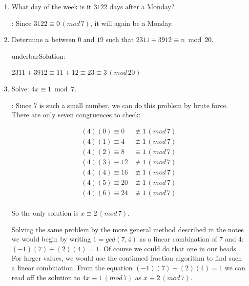 \documentclass[11pt]{amsart}
\begin{document}
\begin{enumerate}


\item What day of the week is it $3122$ days after a Monday?

\medskip

:  Since $3122 \equiv 0 \,(mod\,7)$, it will again be a Monday.

\medskip


\item Determine $n$ between  $0$ and $19$ such that 
$2311+3912 \equiv n \bmod{20}$.

\medskip

underbar{Solution}: 

$2311 + 3912 \equiv 11+12 \equiv 23 \equiv 3 \,(mod\,20)$
 
\medskip
 

 
\item Solve:  $4x\equiv 1\bmod 7$.

\medskip

: Since $7$ is such a small number, we can do this problem by
brute force. There are only seven congruences to check:

\begin{align*}
(4)(0) \equiv 0 &\not\equiv 1\,(mod\, 7)\\[4pt]
(4)(1) \equiv 4 &\not\equiv 1\,(mod\, 7)\\[4pt]
(4)(2) \equiv 8 &\equiv 1\,(mod\, 7)\\[4pt]
(4)(3) \equiv 12 &\not\equiv 1\,(mod\, 7)\\[4pt]
(4)(4) \equiv 16 &\not\equiv 1\,(mod\, 7)\\[4pt]
(4)(5) \equiv 20 &\not\equiv 1\,(mod\, 7)\\[4pt]
(4)(6) \equiv 24 &\not\equiv 1\,(mod\, 7)\\[4pt]
\end{align*}

So the only solution is $x\equiv 2\,(mod\,7)$.

Solving the same problem by the more general method described in the notes we would
begin by writing $1 = gcd(7,4)$ as a linear combination of $7$ and $4$:
$(-1)(7) + (2)(4) = 1$. Of course we could do that one in our heads. For larger values,
we would use the continued fraction algorithm to find such a linear combination.
From the equation $(-1)(7) + (2)(4) = 1$ we can read off the solution to $4x\equiv 1\,(mod\,7)$
as $x\equiv 2\,(mod\,7)$.


\end{enumerate}
\end{document}
